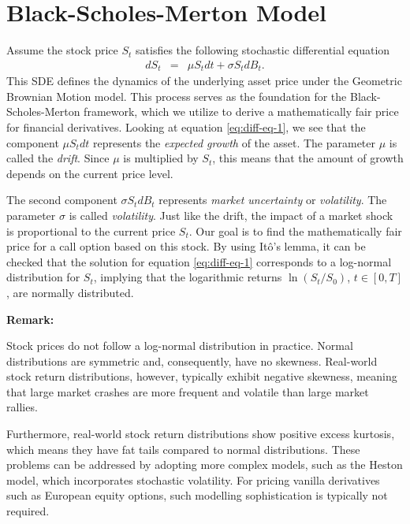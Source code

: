 \documentclass{article}
\newenvironment{importantremark}{%
    \begin{mdframed}[topline=false, bottomline=false, rightline=false, linewidth=2pt, linecolor=gray!50, innerleftmargin=10pt]%
    \textbf{Remark:} %
}{%
    \end{mdframed}%
}
\theoremstyle{definition}
\theoremstyle{remark}
\begin{document}
\section{Black-Scholes-Merton Model}
Assume the stock price $S_t$ satisfies the following stochastic differential equation\begin{equation}\label{eq:diff-eq-1}
    \begin{array}{lcl}
        dS_t &=& \mu S_tdt+\sigma S_td B_t.
    \end{array}
\end{equation}
This SDE defines the dynamics of the underlying asset price under the Geometric Brownian Motion model. This process serves as the foundation for the Black-Scholes-Merton framework, which we utilize to derive a mathematically fair price for financial derivatives. Looking at equation \eqref{eq:diff-eq-1}, we see that the component $\mu S_tdt$ represents the \textit{expected growth} of the asset. The parameter $\mu$ is called the \textit{drift}. Since $\mu$ is multiplied by $S_t$, this means that the amount of growth depends on the current price level. 

The second component $\sigma S_td B_t$ represents \textit{market uncertainty} or \textit{volatility}. The parameter $\sigma$ is called \textit{volatility}. Just like the drift, the impact of a market shock is proportional to the current price $S_t$. Our goal is to find the mathematically fair price for a call option based on this stock. By using Itô's lemma, it can be checked that the solution for equation \eqref{eq:diff-eq-1} corresponds to a log-normal distribution for $S_t$, implying that the logarithmic returns $\ln(S_t/S_0)$, $t\in [0,T]$, are normally distributed.

\begin{importantremark}
Stock prices do not follow a log-normal distribution in practice. Normal distributions are symmetric and, consequently, have no skewness. Real-world stock return distributions, however, typically exhibit negative skewness, meaning that large market crashes are more frequent and volatile than large market rallies.

Furthermore, real-world stock return distributions show positive excess kurtosis, which means they have fat tails compared to normal distributions. These problems can be addressed by adopting more complex models, such as the Heston model, which incorporates stochastic volatility. For pricing vanilla derivatives such as European equity options, such modelling sophistication is typically not required.
\end{importantremark}
\end{document}
